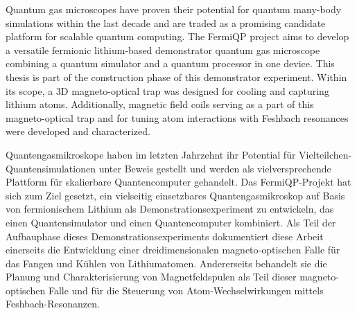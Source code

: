 Quantum gas microscopes have proven their potential for quantum many-body simulations within the last decade and are traded as a promising candidate platform for scalable quantum computing. The FermiQP project aims to develop a versatile fermionic lithium-based demonstrator quantum gas microscope combining a quantum simulator and a quantum processor in one device. This thesis is part of the construction phase of this demonstrator experiment. Within its scope, a 3D magneto-optical trap was designed for cooling and capturing lithium atoms. Additionally, magnetic field coils serving as a part of this magneto-optical trap and for tuning atom interactions with Feshbach resonances were developed and characterized.
\vspace{2cm}

Quantengasmikroskope haben im letzten Jahrzehnt ihr Potential für Vielteilchen-Quantensimulationen unter Beweis gestellt und werden als vielversprechende Plattform für skalierbare Quantencomputer gehandelt. Das FermiQP-Projekt hat sich zum Ziel gesetzt, ein vielseitig einsetzbares Quantengasmikroskop auf Basis von fermionischem Lithium als Demonstrationsexperiment zu entwickeln, das einen Quantensimulator und einen Quantencomputer kombiniert. Als Teil der Aufbauphase dieses Demonstrationsexperiments dokumentiert diese Arbeit einerseits die Entwicklung einer dreidimensionalen magneto-optischen Falle für das Fangen und Kühlen von Lithiumatomen. Andererseits behandelt sie die Planung und Charakterisierung von Magnetfeldspulen als Teil dieser magneto-optischen Falle und für die Steuerung von Atom-Wechselwirkungen mittels Feshbach-Resonanzen.